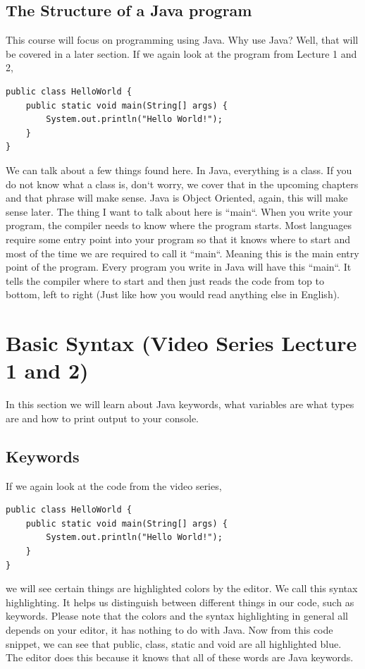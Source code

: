 \documentclass[11]{article}
\begin{document}
\subsection{The Structure of a Java program}
This course will focus on programming using Java. Why use Java? Well, that will be covered in a later section. If we again look at the program from Lecture 1 and 2, 

\begin{lstlisting}
public class HelloWorld {
    public static void main(String[] args) {
        System.out.println("Hello World!");
    }
}
\end{lstlisting}

We can talk about a few things found here. In Java, everything is a class. If you do not know what a class is, don`t worry, we cover that in the upcoming chapters and that phrase will make sense. Java is Object Oriented, again, this will make sense later. The thing I want to talk about here is ``main``. When you write your program, the compiler needs to know where the program starts. Most languages require some entry point into your program so that it knows where to start and most of the time we are required to call it ``main``. Meaning this is the main entry point of the program. Every program you write in Java will have this ``main``. It tells the compiler where to start and then just reads the code from top to bottom, left to right (Just like how you would read anything else in English).

\section{Basic Syntax (Video Series Lecture 1 and 2)}
In this section we will learn about Java keywords, what variables are what types are and how to print output to your console.
\subsection{Keywords}
If we again look at the code from the video series,
\begin{lstlisting}
public class HelloWorld {
    public static void main(String[] args) {
        System.out.println("Hello World!");
    }
}
\end{lstlisting}
we will see certain things are highlighted colors by the editor. We call this syntax highlighting. It helps us distinguish between different things in our code, such as keywords. Please note that the colors and the syntax highlighting in general all depends on your editor, it has nothing to do with Java. Now from this code snippet, we can see that public, class, static and void are all highlighted blue. The editor does this because it knows that all of these words are Java keywords.\\
\end{document}
